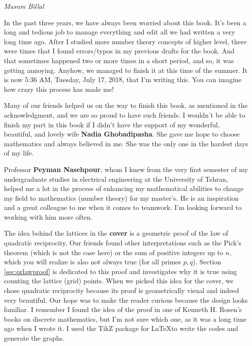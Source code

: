 \documentclass[leqno,12pt]{book}
\begin{document}
\begin{flushright}
	\sl Masum Billal
\end{flushright}

\newpage

In the past three years, we have always been worried about this book. It's been a long and tedious job to manage everything and edit all we had written a very long time ago. After I studied more number theory concepts of higher level, there were times that I found errors/typos in my previous drafts for the book. And that sometimes happened two or more times in a short period, and so, it was getting annoying. Anyhow, we managed to finish it at this time of the summer. It is now 5:36 AM, Tuesday, July 17, 2018, that I'm writing this. You can imagine how crazy this process has made me!

\vspace{0.3cm}
Many of our friends helped us on the way to finish this book, as mentioned in the acknowledgment, and we are so proud to have such friends. I wouldn't be able to finish my part in this book if I didn't have the support of my wonderful, beautiful, and lovely wife \textbf{Nadia Ghobadipasha}. She gave me hope to choose mathematics and always believed in me. She was the only one in the hardest days of my life.

\vspace{0.3cm}

Professor \textbf{Peyman Nasehpour}, whom I knew from the very first semester of my undergraduate studies in electrical engineering at the University of Tehran, helped me a lot in the process of enhancing my mathematical abilities to change my field to mathematics (number theory) for my master's.  He is an inspiration and a great colleague to me when it comes to teamwork. I'm looking forward to working with him more often.

\vspace{0.3cm}

The idea behind the lattices in the \textbf{cover} is a geometric proof of the law of quadratic reciprocity. Our friends found other interpretations such as the Pick's theorem (which is not the case here) or the sum of positive integers up to $n$, which you will realize is also not always true (for all primes $p,q$). Section \eqref{sec:qrlawproof} is dedicated to this proof and investigates why it is true using counting the lattice (grid) points. When we picked this idea for the cover, we chose quadratic reciprocity because its proof is geometrically visual and indeed very beautiful. Our hope was to make the reader curious because the design looks familiar. I remember I found the idea of the proof in one of Kenneth H. Rosen's books on discrete mathematics, but I'm not sure which one, as it was a long time ago when I wrote it. I used the TikZ package for \LaTeX to write the codes and generate the graphs.
\end{document}
